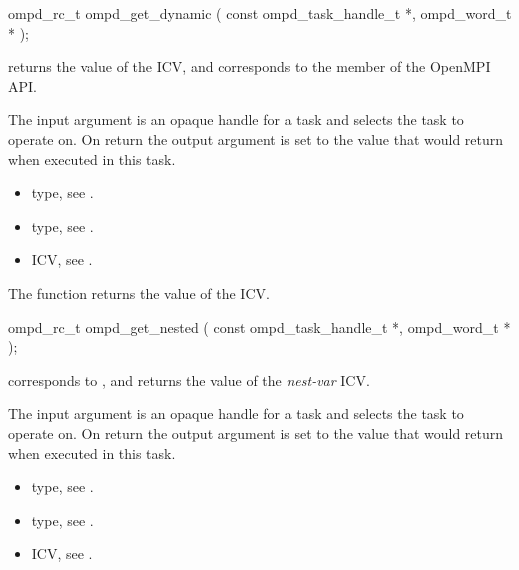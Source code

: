 \format
\begin{cspecific}
\begin{ompSyntax}
ompd_rc_t ompd_get_dynamic (
  const ompd_task_handle_t *,
  ompd_word_t *
);
\end{ompSyntax}
\end{cspecific}

\descr
{} returns the value of the
 ICV,
and corresponds to the  member of the OpenMPI API.

\argdesc
The input argument  is an opaque handle for a task and selects the task to operate on.
On return the output argument  is set to the value that  would return when
executed in this task.

\crossreferences
\begin{itemize}
	\item {} type, see .
	\item {} type, see .
	\item {} ICV, see .
\end{itemize}


\label{subsubsubsec:ompd_get_nested}
\summary
The  function returns the value of the  ICV.

\format
\begin{cspecific}
\begin{ompSyntax}
ompd_rc_t ompd_get_nested (
  const ompd_task_handle_t *,
  ompd_word_t *
);
\end{ompSyntax}
\end{cspecific}

\descr
{} corresponds to ,
and returns the value of the \emph{nest-var} ICV.

\argdesc
The input argument  is an opaque handle for a task and selects the task to operate on.
On return the output argument  is set to the value that  would return when
executed in this task.

\crossreferences
\begin{itemize}
	\item {} type, see .
	\item {} type, see .
	\item {} ICV, see .
\end{itemize}


